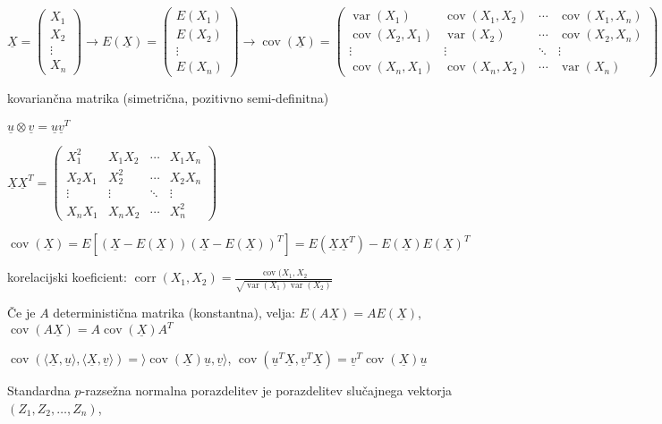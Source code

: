 \documentclass[11pt,a4paper]{amsart}
\theoremstyle{definition} %
\theoremstyle{plain} %
\newcommand{\X}{\underline{X}}
\newcommand{\uu}{\underline{u}}
\newcommand{\uv}{\underline{v}}
\DeclareMathOperator{\cov}{cov}
\DeclareMathOperator{\var}{var}
\DeclareMathOperator{\corr}{corr}
\begin{document}
\thispagestyle{empty}
\setlength{\parindent}{0pt}




$\X = \left( \begin{matrix}
  X_1 \\ X_2 \\ \vdots \\ X_n
\end{matrix} \right)
 \longrightarrow E(\X) = \left( \begin{matrix} E(X_1) \\ E(X_2) \\ \vdots \\ E(X_n) \end{matrix} \right)
 \longrightarrow \cov(\X) = \left(
 \begin{matrix}
 \var(X_1)  & \cov(X_1,X_2) & \cdots & \cov(X_1,X_n) \\
 \cov(X_2,X_1) & \var(X_2) & \cdots & \cov(X_2, X_n) \\
 \vdots  & \vdots & \ddots & \vdots \\
 \cov(X_n, X_1) & \cov(X_n,X_2) & \cdots & \var(X_n)
 \end{matrix}   \right)$

 kovariančna matrika (simetrična, pozitivno semi-definitna)

 $\uu \otimes \uv = \uu\uv^T$

 $\X \X^T =  \left(
 \begin{matrix}
 X_1^2  &X_1X_2 & \cdots &X_1X_n \\
 X_2X_1 & X_2^2 & \cdots & X_2 X_n \\
 \vdots  & \vdots & \ddots & \vdots \\
 X_n X_1 & X_nX_2 & \cdots & X_n^2
 \end{matrix}   \right)$

 $\cov(\X) = E[(\X-E(\X))(\X - E(\X))^T] = E(\X\X^T) - E(\X)E(\X)^T$

korelacijski koeficient: $\corr(X_1,X_2) = \frac{\cov(X_1,X_2}{\sqrt{\var(X_1)
\var(X_2)}}$

 Če je $A$ deterministična matrika (konstantna), velja: $E(A\X) = A E(\X)$,
 $\cov(A\X) = A\cov(\X)A^T$

 $\cov(\langle \X, \uu \rangle , \langle \X, \uv \rangle) =
 \rangle \cov(\X)\uu,\uv \rangle$, $\cov (\uu^T
 \X, \uv^T \X) = \uv^T \cov(\X) \uu$

Standardna $p$-razsežna normalna porazdelitev je porazdelitev slučajnega
vektorja $ \left( Z_1 ,  Z_2 , \ldots , Z_n  \right)$,
\end{document}
